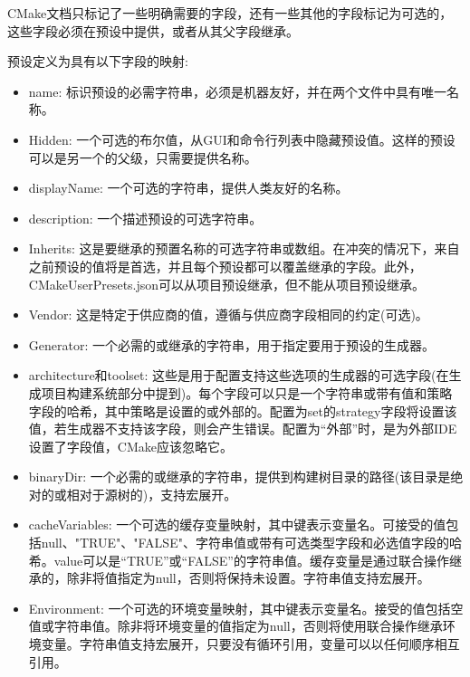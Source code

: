 \begin{tcolorbox}[colback=blue!5!white,colframe=blue!75!black,title=Note]
CMake文档只标记了一些明确需要的字段，还有一些其他的字段标记为可选的，这些字段必须在预设中提供，或者从其父字段继承。
\end{tcolorbox}

预设定义为具有以下字段的映射:

\begin{itemize}
\item 
name: 标识预设的必需字符串，必须是机器友好，并在两个文件中具有唯一名称。

\item 
Hidden: 一个可选的布尔值，从GUI和命令行列表中隐藏预设值。这样的预设可以是另一个的父级，只需要提供名称。

\item 
displayName: 一个可选的字符串，提供人类友好的名称。

\item 
description: 一个描述预设的可选字符串。

\item 
Inherits: 这是要继承的预置名称的可选字符串或数组。在冲突的情况下，来自之前预设的值将是首选，并且每个预设都可以覆盖继承的字段。此外，CMakeUserPresets.json可以从项目预设继承，但不能从项目预设继承。

\item 
Vendor: 这是特定于供应商的值，遵循与供应商字段相同的约定(可选)。

\item 
Generator: 一个必需的或继承的字符串，用于指定要用于预设的生成器。

\item 
architecture和toolset: 这些是用于配置支持这些选项的生成器的可选字段(在生成项目构建系统部分中提到)。每个字段可以只是一个字符串或带有值和策略字段的哈希，其中策略是设置的或外部的。配置为set的strategy字段将设置该值，若生成器不支持该字段，则会产生错误。配置为“外部”时，是为外部IDE设置了字段值，CMake应该忽略它。

\item 
binaryDir: 一个必需的或继承的字符串，提供到构建树目录的路径(该目录是绝对的或相对于源树的)，支持宏展开。

\item 
cacheVariables: 一个可选的缓存变量映射，其中键表示变量名。可接受的值包括null、"TRUE"、"FALSE"、字符串值或带有可选类型字段和必选值字段的哈希。value可以是“TRUE”或“FALSE”的字符串值。缓存变量是通过联合操作继承的，除非将值指定为null，否则将保持未设置。字符串值支持宏展开。

\item 
Environment: 一个可选的环境变量映射，其中键表示变量名。接受的值包括空值或字符串值。除非将环境变量的值指定为null，否则将使用联合操作继承环境变量。字符串值支持宏展开，只要没有循环引用，变量可以以任何顺序相互引用。
\end{itemize}

